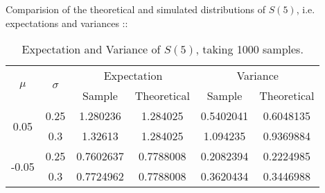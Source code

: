 \documentclass[11pt]{article}
\begin{document}
\newpage
Comparision of the theoretical and simulated distributions of $S(5)$, i.e. expectations and variances ::
\begin{table}[H]
\begin{center}
	\begin{tabular}{||c | c || c c | c c ||}
	\hline
		\multirow{2}{*}{$\mu$} & \multirow{2}{*}{$\sigma$} & \multicolumn{2}{|c}{Expectation} & \multicolumn{2}{|c||}{Variance}\\
		 & & Sample & Theoretical & Sample & Theoretical\\ 
	\hline
		\multirow{2}{*}{0.05} & 0.25 & 1.280236 & 1.284025 & 0.5402041 & 0.6048135\\
		 & 0.3 & 1.32613 & 1.284025 & 1.094235 & 0.9369884\\
		\multirow{2}{*}{-0.05} & 0.25 & 0.7602637 & 0.7788008 & 0.2082394 & 0.2224985\\
		 & 0.3 & 0.7724962 & 0.7788008 & 0.3620434 & 0.3446988\\
	\hline
	\end{tabular}
	\caption{Expectation and Variance of $S(5)$, taking 1000 samples.}
\end{center}
\end{table}
\end{document}
